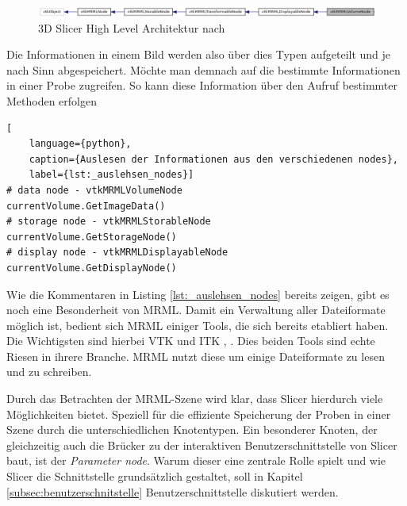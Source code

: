\begin{figure}[h]
	\centering
	\includegraphics[width=1\textwidth]{img/slicer_class_index.jpg}
	\caption{3D Slicer High Level Architektur nach \citet{slicer2024}}
	\label{fig:3d_slicer_class}
\end{figure}

Die Informationen in einem Bild werden also über dies Typen aufgeteilt und je
nach Sinn abgespeichert. Möchte man demnach auf die bestimmte Informationen in einer
Probe zugreifen. So kann diese Information über den Aufruf bestimmter Methoden
erfolgen

\begin{lstlisting}[
	language={python},
	caption={Auslesen der Informationen aus den verschiedenen nodes},
	label={lst:_auslehsen_nodes}]
# data node - vtkMRMLVolumeNode
currentVolume.GetImageData()
# storage node - vtkMRMLStorableNode
currentVolume.GetStorageNode()
# display node - vtkMRMLDisplayableNode
currentVolume.GetDisplayNode()
\end{lstlisting}

Wie die Kommentaren in Listing \ref{lst:_auslehsen_nodes} bereits zeigen, gibt es
noch eine Besonderheit von \ac{MRML}. Damit ein Verwaltung aller Dateiformate möglich
ist, bedient sich \ac{MRML} einiger Tools, die sich bereits etabliert haben. Die
Wichtigsten sind hierbei \ac{VTK} und \ac{ITK} \citep[vgl.][]{vtk2024}, \citep[vgl.][]{itk2024}.
Dies beiden Tools sind echte Riesen in ihrere Branche. \ac{MRML} nutzt diese um einige
Dateiformate zu lesen und zu schreiben.

Durch das Betrachten der \ac{MRML}-Szene wird klar, dass Slicer hierdurch viele Möglichkeiten
bietet. Speziell für die effiziente Speicherung der Proben in einer Szene durch
die unterschiedlichen Knotentypen. Ein besonderer Knoten, der gleichzeitig auch
die Brücker zu der interaktiven Benutzerschnittstelle von Slicer baut, ist der \textit{Parameter
node}. Warum dieser eine zentrale Rolle spielt und wie Slicer die Schnittstelle grundsätzlich
gestaltet, soll in Kapitel \ref{subsec:benutzerschnitstelle}
Benutzerschnittstelle diskutiert werden.

